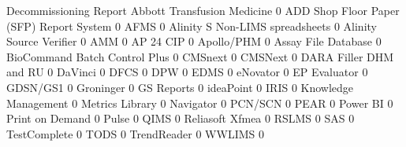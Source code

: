\documentclass{article}
\begin{document}
\begin{Schunk}
\begin{Soutput}
                                           Decommissioning Report
  Abbott Transfusion Medicine                                   0
  ADD Shop Floor Paper (SFP) Report System                      0
  AFMS                                                          0
  Alinity S Non-LIMS spreadsheets                               0
  Alinity Source Verifier                                       0
  AMM                                                           0
  AP 24 CIP                                                     0
  Apollo/PHM                                                    0
  Assay File Database                                           0
  BioCommand Batch Control Plus                                 0
  CMSnext                                                       0
  CMSNext                                                       0
  DARA Filler DHM and RU                                        0
  DaVinci                                                       0
  DFCS                                                          0
  DPW                                                           0
  EDMS                                                          0
  eNovator                                                      0
  EP Evaluator                                                  0
  GDSN/GS1                                                      0
  Groninger                                                     0
  GS Reports                                                    0
  ideaPoint                                                     0
  IRIS                                                          0
  Knowledge Management                                          0
  Metrics Library                                               0
  Navigator                                                     0
  PCN/SCN                                                       0
  PEAR                                                          0
  Power BI                                                      0
  Print on Demand                                               0
  Pulse                                                         0
  QIMS                                                          0
  Reliasoft Xfmea                                               0
  RSLMS                                                         0
  SAS                                                           0
  TestComplete                                                  0
  TODS                                                          0
  TrendReader                                                   0
  WWLIMS                                                        0
                                          

\end{Soutput}
\end{Schunk}
\end{document}

